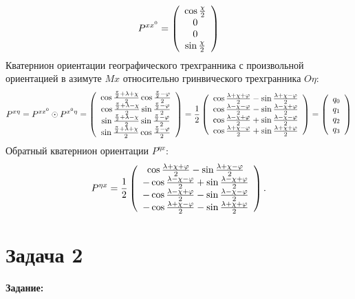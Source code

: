 \documentclass[a4paper,14pt]{article}
\theoremstyle{plain} %
\theoremstyle{definition} %
\theoremstyle{remark} %
\begin{document}
{\begin{eqnarray*}
    P^{xx^0}= \left( \begin{array}{c}
            \cos\frac{\chi}{2} \cr
            0 \cr
            0 \cr
            \sin\frac{\chi}{2}
        \end{array} \right)
\end{eqnarray*}
Кватернион ориентации географического трехгранника с произвольной
ориентацией в азимуте $Mx$ относительно гринвического трехгранника $O\eta$:
{\small\begin{eqnarray*}
    P^{x\eta}=P^{xx^0} \odot P^{x^0\eta}=
    \left(
    \begin{array}{c}
            \cos\frac{\frac{\pi}{2}+\lambda + \chi}{2}\cos \frac{\frac{\pi}{2}-\varphi}{2}\cr
            \cos\frac{\frac{\pi}{2}+\lambda - \chi}{2}\sin\frac{\frac{\pi}{2}-\varphi}{2}\cr
            \sin\frac{\frac{\pi}{2}+\lambda - \chi}{2}\sin \frac{\frac{\pi}{2}-\varphi}{2}\cr
            \sin\frac{\frac{\pi}{2}+\lambda + \chi}{2}\cos \frac{\frac{\pi}{2}-\varphi}{2}
        \end{array}
    \right)
    =
    \frac{1}{2}
    \left(
    \begin{array}{c}
            \cos\frac{\lambda+\chi+\varphi}{2}- \sin\frac{\lambda+\chi-\varphi}{2}\cr
            \cos\frac{\lambda-\chi-\varphi}{2}- \sin\frac{\lambda-\chi+\varphi}{2}\cr
            \cos\frac{\lambda-\chi+\varphi}{2}+ \sin\frac{\lambda-\chi-\varphi}{2}\cr
            \cos\frac{\lambda+\chi-\varphi}{2}+ \sin\frac{\lambda+\chi+\varphi}{2}
        \end{array}
    \right)=
    \left(
    \begin{array}{c}
            q_0\cr
            q_1\cr
            q_2\cr
            q_3
        \end{array}
    \right)
\end{eqnarray*}
}
Обратный кватернион ориентации $P^{\eta x}$:
\begin{eqnarray*}
    P^{\eta x} =\frac{1}{2}
    \left(
    \begin{array}{c}
            \cos\frac{\lambda+\chi+\varphi}{2}- \sin\frac{\lambda+\chi-\varphi}{2}\cr
            -\cos\frac{\lambda-\chi-\varphi}{2}+ \sin\frac{\lambda-\chi+\varphi}{2}\cr
            -\cos\frac{\lambda-\chi+\varphi}{2}- \sin\frac{\lambda-\chi-\varphi}{2}\cr
            -\cos\frac{\lambda+\chi-\varphi}{2}- \sin\frac{\lambda+\chi+\varphi}{2}
        \end{array}
    \right).
\end{eqnarray*}
\newpage
\section{Задача 2}
\textbf{Задание:}

}
\end{document}
